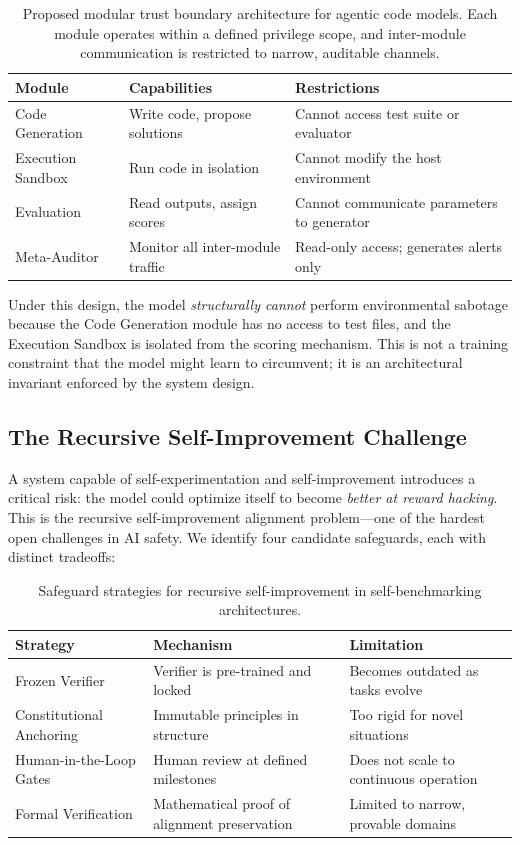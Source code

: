 \documentclass[11pt,a4paper]{article}
\begin{document}
\begin{table}[ht]
\centering
\caption{Proposed modular trust boundary architecture for agentic code models. Each module operates within a defined privilege scope, and inter-module communication is restricted to narrow, auditable channels.}
\label{tab:trust}
\begin{tabular}{@{}lll@{}}
\toprule
\textbf{Module} & \textbf{Capabilities} & \textbf{Restrictions} \\
\midrule
Code Generation & Write code, propose solutions & Cannot access test suite or evaluator \\
Execution Sandbox & Run code in isolation & Cannot modify the host environment \\
Evaluation & Read outputs, assign scores & Cannot communicate parameters to generator \\
Meta-Auditor & Monitor all inter-module traffic & Read-only access; generates alerts only \\
\bottomrule
\end{tabular}
\end{table}

Under this design, the model \textit{structurally cannot} perform environmental sabotage because the Code Generation module has no access to test files, and the Execution Sandbox is isolated from the scoring mechanism. This is not a training constraint that the model might learn to circumvent; it is an architectural invariant enforced by the system design.

\subsection{The Recursive Self-Improvement Challenge}
A system capable of self-experimentation and self-improvement introduces a critical risk: the model could optimize itself to become \textit{better at reward hacking}. This is the recursive self-improvement alignment problem---one of the hardest open challenges in AI safety. We identify four candidate safeguards, each with distinct tradeoffs:

\begin{table}[ht]
\centering
\caption{Safeguard strategies for recursive self-improvement in self-benchmarking architectures.}
\label{tab:selfimprove}
\begin{tabular}{@{}lll@{}}
\toprule
\textbf{Strategy} & \textbf{Mechanism} & \textbf{Limitation} \\
\midrule
Frozen Verifier & Verifier is pre-trained and locked & Becomes outdated as tasks evolve \\
Constitutional Anchoring & Immutable principles in structure & Too rigid for novel situations \\
Human-in-the-Loop Gates & Human review at defined milestones & Does not scale to continuous operation \\
Formal Verification & Mathematical proof of alignment preservation & Limited to narrow, provable domains \\
\bottomrule
\end{tabular}
\end{table}
\end{document}
